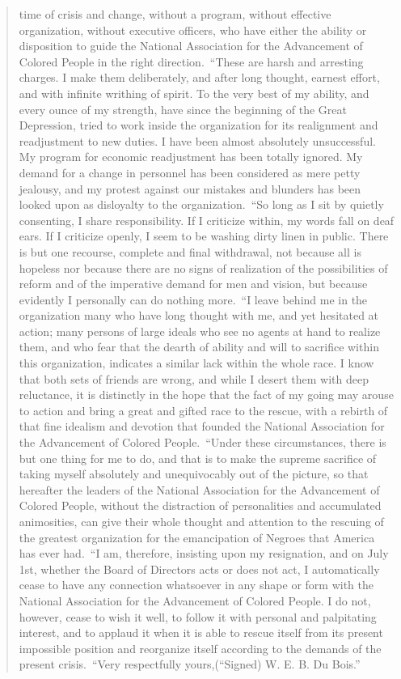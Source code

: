 \documentclass[letterpaper,10pt,english]{jupyterBook}
\begin{document}
\begin{quote}
time of crisis and change, without a program, without effective organization, without executive officers, who have either the ability or disposition to guide the National Association for the Advancement of Colored People in the right direction. “These are harsh and arresting charges. I make them deliberately, and after long thought, earnest effort, and with infinite writhing of spirit. To the very best of my ability, and every ounce of my strength, have since the beginning of the Great Depression, tried to work inside the organization for its realignment and readjustment to new duties. I have been almost absolutely unsuccessful. My program for economic readjustment has been totally ignored. My demand for a change in personnel has been considered as mere petty jealousy, and my protest against our mistakes and blunders has been looked upon as disloyalty to the organization. “So long as I sit by quietly consenting, I share responsibility. If I criticize within, my words fall on deaf ears. If I criticize openly, I seem to be washing dirty linen in public. There is but one recourse, complete and final withdrawal, not because all is hopeless nor because there are no signs of realization of the possibilities of reform and of the imperative demand for men and vision, but because evidently I personally can do nothing more. “I leave behind me in the organization many who have long thought with me, and yet hesitated at action; many persons of large ideals who see no agents at hand to realize them, and who fear that the dearth of ability and will to sacrifice within this organization, indicates a similar lack within the whole race. I know that both sets of friends are wrong, and while I desert them with deep reluctance, it is distinctly in the hope that the fact of my going may arouse to action and bring a great and gifted race to the rescue, with a re\sphinxhyphen{}birth of that fine idealism and devotion that founded the National Association for the Advancement of Colored People. “Under these circumstances, there is but one thing for me to do, and that is to make the supreme sacrifice of taking myself absolutely and unequivocably out of the picture, so that hereafter the leaders of the National Association for the Advancement of Colored People, without the distraction of personalities and accumulated animosities, can give their whole thought and attention to the rescuing of the greatest organization for the emancipation of Negroes that America has ever had. “I am, therefore, insisting upon my resignation, and on July 1st, whether the Board of Directors acts or does not act, I automatically cease to have any connection whatsoever in any shape or form with the National Association for the Advancement of Colored People. I do not, however, cease to wish it well, to follow it with personal and palpitating interest, and to applaud it when it is able to rescue itself from its present impossible position and reorganize itself according to the demands of the present crisis. “Very respectfully yours,(“Signed) W. E. B. Du Bois.”
\end{quote}
\end{document}
